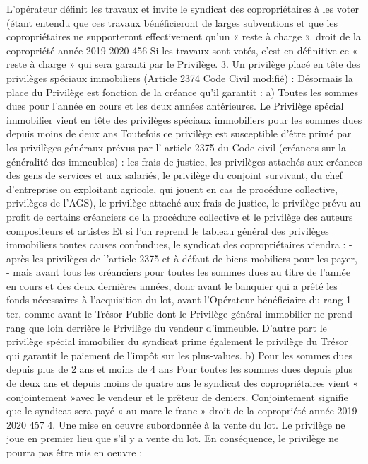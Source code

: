 L’opérateur définit les travaux et invite le syndicat des copropriétaires à les voter (étant entendu que ces travaux bénéficieront de larges subventions et que les copropriétaires ne supporteront effectivement qu’un « reste à charge ».
droit de la copropriété année 2019-2020
456
Si les travaux sont votés, c’est en définitive ce « reste à charge » qui sera garanti par le Privilège.
3. Un privilège placé en tête des privilèges spéciaux immobiliers (Article 2374 Code Civil modifié) :
Désormais la place du Privilège est fonction de la créance qu’il garantit :
a) Toutes les sommes dues pour l’année en cours et les deux années antérieures.
Le Privilège spécial immobilier vient en tête des privilèges spéciaux immobiliers pour les sommes dues depuis moins de deux ans
Toutefois ce privilège est susceptible d'être primé par les privilèges généraux prévus par l’ article 2375 du Code civil (créances sur la généralité des immeubles) : les frais de justice, les privilèges attachés aux créances des gens de services et aux salariés, le privilège du conjoint survivant, du chef d’entreprise ou exploitant agricole, qui jouent en cas de procédure collective, privilèges de l'AGS), le privilège attaché aux frais de justice, le privilège prévu au profit de certains créanciers de la procédure collective et le privilège des auteurs compositeurs et artistes
Et si l'on reprend le tableau général des privilèges immobiliers toutes causes confondues, le syndicat des copropriétaires viendra :
- après les privilèges de l’article 2375 et à défaut de biens mobiliers pour les payer,
- mais avant tous les créanciers pour toutes les sommes dues au titre de l’année en cours et des deux dernières années, donc avant le banquier qui a prêté les fonds nécessaires à l'acquisition du lot, avant l’Opérateur bénéficiaire du rang 1 ter, comme avant le Trésor Public dont le Privilège général immobilier ne prend rang que loin derrière le Privilège du vendeur d'immeuble.
D'autre part le privilège spécial immobilier du syndicat prime également le privilège du Trésor qui garantit le paiement de l'impôt sur les plus-values.
b) Pour les sommes dues depuis plus de 2 ans et moins de 4 ans
Pour toutes les sommes dues depuis plus de deux ans et depuis moins de quatre ans le syndicat des copropriétaires vient « conjointement »avec le vendeur et le prêteur de deniers.
Conjointement signifie que le syndicat sera payé « au marc le franc »
droit de la copropriété année 2019-2020
457
4. Une mise en oeuvre subordonnée à la vente du lot.
Le privilège ne joue en premier lieu que s’il y a vente du lot.
En conséquence, le privilège ne pourra pas être mis en oeuvre :
